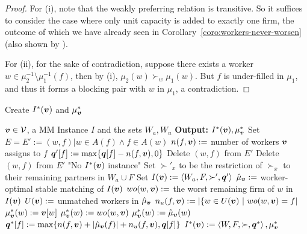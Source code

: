 \begin{proof}
  For (i), note that the weakly preferring relation is transitive. So it suffices to consider the case where only unit capacity is added to exactly one firm, the outcome of which we have already seen in Corollary~\ref{coro:workers-never-worsen} (also shown by  \cite{kominers2020respect}).

  For (ii), for the sake of contradiction, suppose there exists a worker $w \in \mu_2^{-1} \setminus \mu_1^{-1}(f)$, then by (i), $\mu_2(w) \succ_w \mu_1(w)$. But $f$ is under-filled in $\mu_1$, and thus it forms a blocking pair with $w$ in $\mu_1$, a contradiction.
\end{proof}

\begin{algorithm}
  \caption{Create $I^*({\boldsymbol{v}})$ and $\mu^*_{\boldsymbol{v}}$}
  \label{algo:MinSumSP-Algorithm}
  \begin{algorithmic}
    \REQUIRE ${\boldsymbol{v}} \in \mathcal{V}$, a MM Instance $I$ and the sets $W_a, W_u$ \textbf{Output:} $I^*({\boldsymbol{v}}), \mu^*_{\boldsymbol{v}}$
    \STATE Set $E = E' := {(w, f) | w \in A(f) \land f \in A(w)}$
    \STATE $n(f, {\boldsymbol{v}}) :=$ number of workers ${\boldsymbol{v}}$ assigns to $f$
    \STATE $\boldsymbol{q}'[f] := \max \{ \boldsymbol{q}[f] - n(f, {\boldsymbol{v}}), 0 \}$
    \ENDFOR
    \STATE Delete $(w, f)$ from $E'$
    \STATE Delete $(w, f)$ from $E'$
    \ENDIF
    \ENDFOR
    \RETURN "No $I^*({\boldsymbol{v}})$ instance"
    \ENDIF
    \STATE Set $\succ'_x$ to be the restriction of $\succ_x$ to their remaining partners in $W_a \cup F$
    \ENDFOR
    \STATE Set $I({\boldsymbol{v}}) := \left< W_a, F, \succ', \boldsymbol{q}' \right>$
    \STATE $\hat\mu_{\boldsymbol{v}} :=$ worker-optimal stable matching of $I({\boldsymbol{v}})$
    \STATE $wo(w, {\boldsymbol{v}}) :=$ the worst remaining firm of $w$ in $I({\boldsymbol{v}})$
    \ENDFOR
    \STATE $U({\boldsymbol{v}}) :=$ unmatched workers in $\hat\mu_{\boldsymbol{v}}$
    \STATE $n_u(f, {\boldsymbol{v}}) := |\{ w \in U({\boldsymbol{v}}) ~|~ wo(w, {\boldsymbol{v}}) = f|$
    \STATE $\mu^*_{\boldsymbol{v}}(w) := {\boldsymbol{v}}[w]$
    \STATE $\mu^*_{\boldsymbol{v}}(w) := wo(w, {\boldsymbol{v}})$
    \ELSE
    \STATE $\mu^*_{\boldsymbol{v}}(w) := \hat\mu_{\boldsymbol{v}}(w)$
    \ENDIF
    \ENDFOR
    \STATE $\boldsymbol{q}^*[f] := \max\{ n(f, {\boldsymbol{v}}) + |\hat\mu_{\boldsymbol{v}}(f)| + n_u(f, {\boldsymbol{v}}), \boldsymbol{q}[f] \}$
    \ENDFOR
    \RETURN $I^*({\boldsymbol{v}}) := \left< W, F, \succ, \boldsymbol{q}^* \right>, \mu^*_{\boldsymbol{v}}$
  \end{algorithmic}
\end{algorithm}

